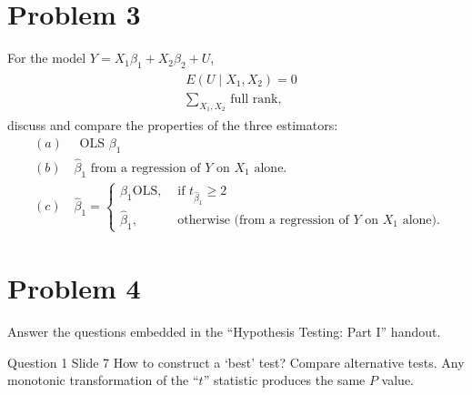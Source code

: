 \documentclass{article}
\begin{document}
\newpage

\section*{Problem 3}
 For the model $Y=X_{1} \beta_{1}+X_{2} \beta_{2}+U$,
\begin{align*}
\begin{aligned}
&E\left(U \mid X_{1}, X_{2}\right)=0 \\
&\sum_{X_{1}, X_{2}} \text { full rank, }
\end{aligned}
\end{align*}
discuss and compare the properties of the three estimators: \\
\begin{align*}
    &(a) \quad \text{ OLS } \beta_{1} \\
    &(b) \quad \hat{\beta}_{1} \text{ from a regression of $Y$ on $X_{1}$ alone.} \\
    &(c) \quad \hat{\beta}_{1}= 
        \begin{cases}
            \beta_{1} \mathrm{OLS}, & \text { if } t_{\hat{\beta}_{1}} \geq 2 \\ 
            \hat{\beta}_{1}, & \text{ otherwise (from a regression of } Y \text{ on } X_{1} \text { alone). }
        \end{cases}    
\end{align*}

\begin{solution}
\end{solution}

\newpage

\section*{Problem 4}
Answer the questions embedded in the ``Hypothesis Testing: Part I'' handout.


\begin{problem}{Question 1 Slide 7}
How to construct a ‘best’ test? Compare alternative tests.
Any monotonic transformation of the “$t$” statistic produces
the same $P$ value.
\end{problem}
\begin{solution}
\end{solution}
\end{document}

